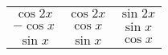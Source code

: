 \begin{tabular}{|c c c|} 
    
        $\cos 2x$& $\cos 2x$ & $\sin 2x$ \\ 
    
        $- \cos x$& $\cos x$ & $\sin x$\\ 
    
        $\sin x$ & $\sin x$ & $\cos x$\\ 
    
\end{tabular} 